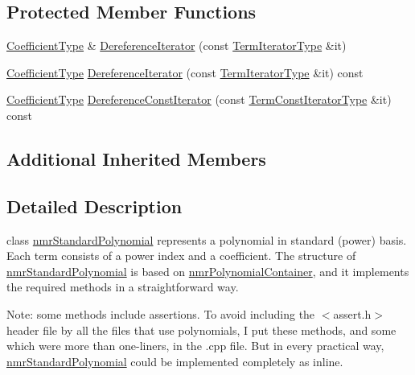 \subsection*{Protected Member Functions}
\begin{DoxyCompactItemize}
\item 
\hyperlink{classnmr_polynomial_base_a8693efdfc8585ccb49abea69f74f3eef}{Coefficient\+Type} \& \hyperlink{classnmr_standard_polynomial_a03b09b1e9f63910970b20c3f23c849be}{Dereference\+Iterator} (const \hyperlink{classnmr_polynomial_container_a276e57445d038e8a16462f47b85719a3}{Term\+Iterator\+Type} \&it)
\item 
\hyperlink{classnmr_polynomial_base_a8693efdfc8585ccb49abea69f74f3eef}{Coefficient\+Type} \hyperlink{classnmr_standard_polynomial_a27fed8c56e3dbdd3e9e94354a3146ca3}{Dereference\+Iterator} (const \hyperlink{classnmr_polynomial_container_a276e57445d038e8a16462f47b85719a3}{Term\+Iterator\+Type} \&it) const 
\item 
\hyperlink{classnmr_polynomial_base_a8693efdfc8585ccb49abea69f74f3eef}{Coefficient\+Type} \hyperlink{classnmr_standard_polynomial_afd34019b92b74fc18c5d8271a08c605c}{Dereference\+Const\+Iterator} (const \hyperlink{classnmr_polynomial_container_aba8d31506ab6a487fdc4fe2815469442}{Term\+Const\+Iterator\+Type} \&it) const 
\end{DoxyCompactItemize}
\subsection*{Additional Inherited Members}


\subsection{Detailed Description}
class \hyperlink{classnmr_standard_polynomial}{nmr\+Standard\+Polynomial} represents a polynomial in standard (power) basis. Each term consists of a power index and a coefficient. The structure of \hyperlink{classnmr_standard_polynomial}{nmr\+Standard\+Polynomial} is based on \hyperlink{classnmr_polynomial_container}{nmr\+Polynomial\+Container}, and it implements the required methods in a straightforward way.

Note\+: some methods include assertions. To avoid including the $<$assert.\+h$>$ header file by all the files that use polynomials, I put these methods, and some which were more than one-\/liners, in the .cpp file. But in every practical way, \hyperlink{classnmr_standard_polynomial}{nmr\+Standard\+Polynomial} could be implemented completely as inline.

